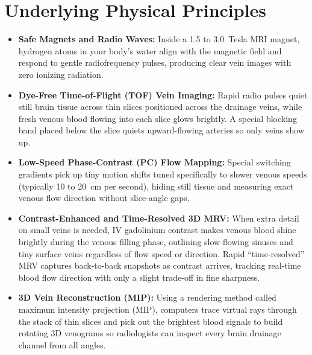 \section{Underlying Physical Principles}
\begin{itemize}
\item \textbf{Safe Magnets and Radio Waves:} Inside a 1.5 to 3.0~Tesla MRI magnet, hydrogen atoms in your body's water align with the magnetic field and respond to gentle radiofrequency pulses, producing clear vein images with zero ionizing radiation.
\item \textbf{Dye-Free Time-of-Flight (TOF) Vein Imaging:} Rapid radio pulses quiet still brain tissue across thin slices positioned across the drainage veins, while fresh venous blood flowing into each slice glows brightly. A special blocking band placed below the slice quiets upward-flowing arteries so only veins show up.
\item \textbf{Low-Speed Phase-Contrast (PC) Flow Mapping:} Special switching gradients pick up tiny motion shifts tuned specifically to slower venous speeds (typically 10 to 20~cm per second), hiding still tissue and measuring exact venous flow direction without slice-angle gaps.
\item \textbf{Contrast-Enhanced and Time-Resolved 3D MRV:} When extra detail on small veins is needed, IV gadolinium contrast makes venous blood shine brightly during the venous filling phase, outlining slow-flowing sinuses and tiny surface veins regardless of flow speed or direction. Rapid ``time-resolved'' MRV captures back-to-back snapshots as contrast arrives, tracking real-time blood flow direction with only a slight trade-off in fine sharpness.
\item \textbf{3D Vein Reconstruction (MIP):} Using a rendering method called maximum intensity projection (MIP), computers trace virtual rays through the stack of thin slices and pick out the brightest blood signals to build rotating 3D venograms so radiologists can inspect every brain drainage channel from all angles.
\end{itemize}

